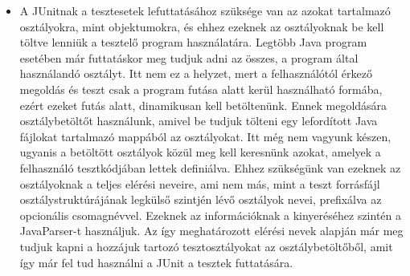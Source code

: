 \documentclass{elteikthesis}
\begin{document}
\begin{itemize}
						\item A JUnitnak a tesztesetek lefuttatásához szüksége van az azokat tartalmazó osztályokra, mint objektumokra, és ehhez ezeknek az osztályoknak be kell töltve lenniük a tesztelő program használatára. Legtöbb Java program esetében már futtatáskor meg tudjuk adni az összes, a program által használandó osztályt. Itt nem ez a helyzet, mert a felhasználótól érkező megoldás és teszt csak a program futása alatt kerül használható formába, ezért ezeket futás alatt, dinamikusan kell betöltenünk. Ennek megoldására osztálybetöltőt használunk, amivel be tudjuk tölteni egy lefordított Java fájlokat tartalmazó mappából az osztályokat. Itt még nem vagyunk készen, ugyanis a betöltött osztályok közül meg kell keresnünk azokat, amelyek a felhasználó tesztkódjában lettek definiálva. Ehhez szükségünk van ezeknek az osztályoknak a teljes elérési neveire, ami nem más, mint a teszt forrásfájl osztálystruktúrájának legkülső szintjén lévő osztályok nevei, prefixálva az opcionális csomagnévvel. Ezeknek az információknak a kinyeréséhez szintén a JavaParser-t használjuk. Az így meghatározott elérési nevek alapján már meg tudjuk kapni a hozzájuk tartozó tesztosztályokat az osztálybetöltőből, amit így már fel tud használni a JUnit a tesztek futtatására.
					\end{itemize}
\end{document}
